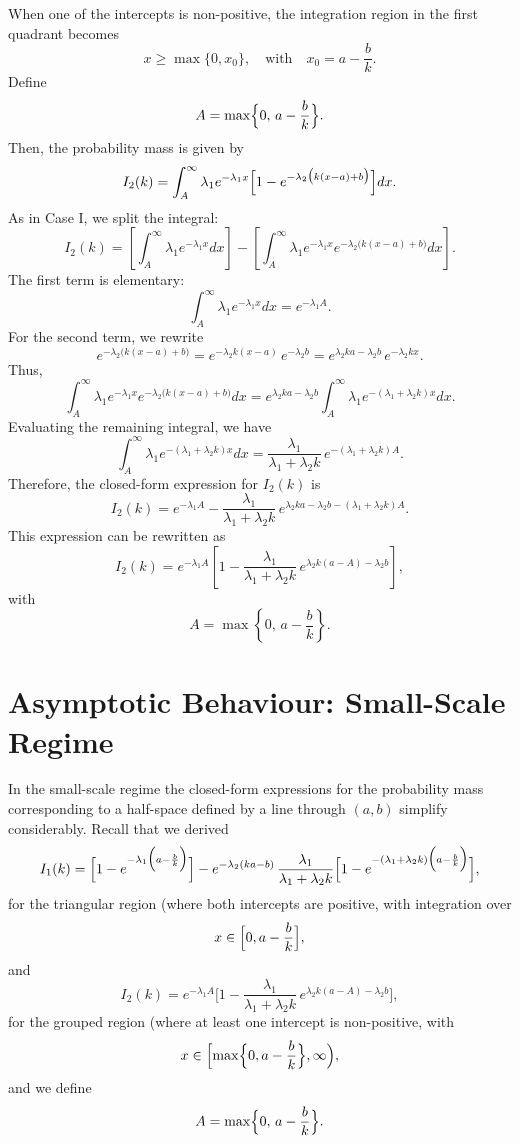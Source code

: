 When one of the intercepts is non-positive, the integration region in the first quadrant becomes
\[
x \ge \max\{0,x_0\}, \quad \text{with}\quad x_0 = a-\frac{b}{k}.
\]
Define
\[
A = \max\Bigl\{0,\,a-\frac{b}{k}\Bigr\}.
\]
Then, the probability mass is given by
\begin{equation}\label{eq:Ik_case23}
  I_2(k)=\int_{A}^{\infty} \lambda_1 e^{-\lambda_1 x}\Bigl[1-e^{-\lambda_2\bigl(k(x-a)+b\bigr)}\Bigr]dx.
\end{equation}
As in Case I, we split the integral:
\[
I_2(k)=\left[\int_{A}^{\infty} \lambda_1 e^{-\lambda_1 x}dx\right]-\left[\int_{A}^{\infty} \lambda_1 e^{-\lambda_1 x}e^{-\lambda_2\bigl(k(x-a)+b\bigr)}dx\right].
\]
The first term is elementary:
\[
\int_{A}^{\infty} \lambda_1 e^{-\lambda_1 x}dx = e^{-\lambda_1 A}.
\]
For the second term, we rewrite
\[
e^{-\lambda_2\bigl(k(x-a)+b\bigr)} = e^{-\lambda_2k(x-a)}\,e^{-\lambda_2b} = e^{\lambda_2ka-\lambda_2b}\,e^{-\lambda_2kx}.
\]
Thus,
\[
\int_{A}^{\infty} \lambda_1 e^{-\lambda_1 x}e^{-\lambda_2\bigl(k(x-a)+b\bigr)}dx = e^{\lambda_2ka-\lambda_2b}\int_{A}^{\infty} \lambda_1 e^{-(\lambda_1+\lambda_2k)x}dx.
\]
Evaluating the remaining integral, we have
\[
\int_{A}^{\infty} \lambda_1 e^{-(\lambda_1+\lambda_2k)x}dx = \frac{\lambda_1}{\lambda_1+\lambda_2k}\,e^{-(\lambda_1+\lambda_2k)A}.
\]
Therefore, the closed-form expression for \(I_2(k)\) is
\[
I_2(k)=e^{-\lambda_1 A} - \frac{\lambda_1}{\lambda_1+\lambda_2k}\,e^{\lambda_2ka-\lambda_2b-(\lambda_1+\lambda_2k)A}.
\]
This expression can be rewritten as
\[
I_2(k)=e^{-\lambda_1 A}\left[1-\frac{\lambda_1}{\lambda_1+\lambda_2k}\,e^{\lambda_2k(a-A)-\lambda_2b}\right],
\]
with
\[
A=\max\left\{0,\,a-\frac{b}{k}\right\}.
\]

\section{Asymptotic Behaviour: Small-Scale Regime}

In the small-scale regime the closed-form expressions for the probability mass corresponding to a half-space defined by a line through \((a,b)\) simplify considerably. Recall that we derived
\[
I_1(k)=\Bigl[1-e^{-\lambda_1\Bigl(a-\frac{b}{k}\Bigr)}\Bigr]
- e^{-\lambda_2(ka-b)}\,\frac{\lambda_1}{\lambda_1+\lambda_2k}\Bigl[1-e^{-(\lambda_1+\lambda_2k)\Bigl(a-\frac{b}{k}\Bigr)}\Bigr],
\]
for the triangular region (where both intercepts are positive, with integration over
\[
x\in\Bigl[0,a-\frac{b}{k}\Bigr],
\]
and
\[
I_2(k)=e^{-\lambda_1A}\Biggl[1-\frac{\lambda_1}{\lambda_1+\lambda_2k}\,e^{\lambda_2k(a-A)-\lambda_2b}\Biggr],
\]
for the grouped region (where at least one intercept is non-positive, with
\[
x\in\Bigl[\max\Bigl\{0,a-\frac{b}{k}\Bigr\},\infty\Bigr),
\]
and we define
\[
A=\max\Bigl\{0,\,a-\frac{b}{k}\Bigr\}.
\]

